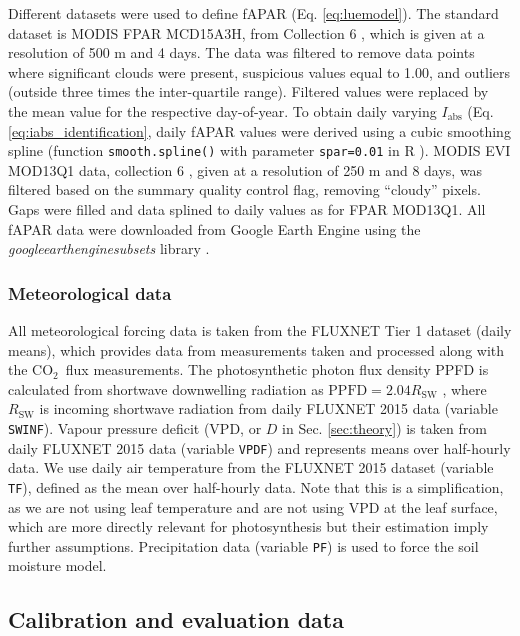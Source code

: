 \documentclass{myreport}
\newcommand{\coo}{CO$_2$}
\begin{document}
Different datasets were used to define fAPAR (Eq. \ref{eq:luemodel}). The standard dataset is MODIS FPAR MCD15A3H, from Collection 6 \citep{modis_fpar_6}, which is given at a resolution of 500 m and 4 days. The data was filtered to remove data points where significant clouds were present, suspicious values equal to 1.00, and outliers (outside three times the inter-quartile range). Filtered values were replaced by the mean value for the respective day-of-year. To obtain daily varying $I_\text{abs}$ (Eq. \ref{eq:iabs_identification}, daily fAPAR values were derived using a cubic smoothing spline (function \texttt{smooth.spline()} with parameter \texttt{spar=0.01} in R \citep{Rcoreteam}). MODIS EVI MOD13Q1 data, collection 6 \citep{modis_evi_6}, given at a resolution of 250 m and 8 days, was filtered based on the summary quality control flag, removing ``cloudy'' pixels. Gaps were filled and data splined to daily values as for FPAR MOD13Q1. All fAPAR data were downloaded from Google Earth Engine using the \textit{google\textunderscore earth\textunderscore engine\textunderscore subsets} library \citep{gee_subset}. 

\subsubsection{Meteorological data}
\label{sec:ppfd}
All meteorological forcing data is taken from the FLUXNET Tier 1 dataset (daily means), which provides data from measurements taken and processed along with the \coo\ flux measurements. The photosynthetic photon flux density PPFD is calculated from shortwave downwelling radiation as $\text{PPFD} = 2.04 R_{\text{SW}}$ \citep{meek84}, where $R_{\text{SW}}$ is incoming shortwave radiation from daily FLUXNET 2015 data (variable \texttt{SW\textunderscore IN\textunderscore F}). Vapour pressure deficit (VPD, or $D$ in Sec. \ref{sec:theory}) is taken from daily FLUXNET 2015 data (variable \texttt{VPD\textunderscore F}) and represents means over half-hourly data. We use daily air temperature from the FLUXNET 2015 dataset (variable \texttt{T\textunderscore F}), defined as the mean over half-hourly data. Note that this is a simplification, as we are not using leaf temperature and are not using VPD at the leaf surface, which are more directly relevant for photosynthesis but their estimation imply further assumptions. Precipitation data (variable \texttt{P\textunderscore F}) is used to force the soil moisture model.

\subsection{Calibration and evaluation data}
\end{document}
